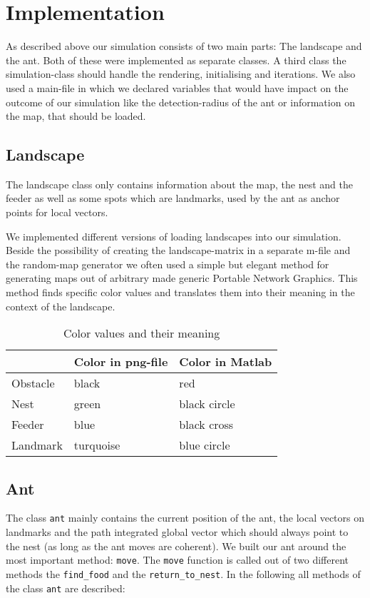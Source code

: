 \documentclass[11pt]{article}
\begin{document}
\section{Implementation}
As described above our simulation consists of two main parts: The landscape and the ant. Both of these were implemented as separate classes. A third class the simulation-class should handle the rendering, initialising and iterations. We also used a main-file in which we declared variables that would have impact on the outcome of our simulation like the detection-radius of the ant or information on the map, that should be loaded.
\subsection{Landscape}
The landscape class only contains information about the map, the nest and the feeder as well as some spots which are landmarks, used by the ant as anchor points for local vectors.

We implemented different versions of loading landscapes into our simulation. Beside the possibility of creating the landscape-matrix in a separate m-file and the random-map generator  we often used a simple but elegant method for generating maps out of arbitrary made generic Portable Network Graphics. This method finds specific color values and translates them into their meaning in the context of the landscape.

\begin{table}[h!]
\centering
\begin{tabular}{lll}
	\cmidrule[1pt]{2-3}
	& Color in png-file & Color in Matlab \\
	\midrule
Obstacle & black & red \\ \midrule
Nest & green & black circle \\ \midrule
Feeder & blue & black cross \\ \midrule
Landmark & turquoise & blue circle \\
\bottomrule  
\end{tabular}
\caption{Color values and their meaning}
\end{table}

\subsection{Ant}

The class \texttt{ant} mainly contains the current position of the ant, the local vectors on landmarks and the path integrated global vector which should always point to the nest (as long as the ant moves are coherent).
We built our ant around the most important method: \texttt{move}. The  \texttt{move} function is called out of two different methods the  \texttt{find\_food} and the \texttt{return\_to\_nest}. In the following all methods of the class \texttt{ant} are described:
\end{document}
